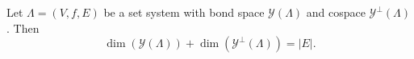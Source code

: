 Let $\Lambda = (V, f, E)$ be a set system with bond space $\mathcal{Y}(\Lambda)$ and cospace $\mathcal{Y}^\perp(\Lambda)$. Then
$$\dim(\mathcal{Y}(\Lambda)) + \dim(\mathcal{Y}^\perp(\Lambda)) = |E|.$$
